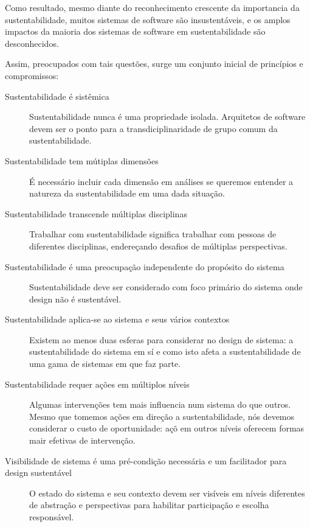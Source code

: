 Como resultado, mesmo diante do reconhecimento crescente da importancia da sustentabilidade,
muitos sistemas de software são insustentáveis, e os amplos impactos
da maioria dos sistemas de software em sustentabilidade são desconhecidos.

Assim, preocupados com tais questões, surge um conjunto inicial de princípios e
compromissos:

\begin{description}

  \item [Sustentabilidade é sistêmica]
    Sustentabilidade nunca é uma propriedade isolada. Arquitetos de software devem
    ser o ponto para a transdiciplinaridade de grupo comum da sustentabilidade.

  \item [Sustentabilidade tem mútiplas dimensões]
    É necessário incluir cada dimensão em análises se queremos entender
    a natureza da sustentabilidade em uma dada situação.

  \item [Sustentabilidade transcende múltiplas disciplinas]
    Trabalhar com sustentabilidade significa trabalhar com pessoas de diferentes
    disciplinas, endereçando desafios de múltiplas perspectivas.

  \item [Sustentabilidade é uma preocupação independente do propósito do sistema]
    Sustentabilidade deve ser considerado com foco primário do sistema onde
    design não é sustentável.

  \item [Sustentabilidade aplica-se ao sistema e seus vários contextos]
    Existem ao menos duas esferas para considerar no design de sistema: a sustentabilidade do
    sistema em sí e como isto afeta a sustentabilidade de uma gama de sistemas em que faz parte.

  \item [Sustentabilidade requer ações em múltiplos níveis]
    Algumas intervenções tem mais influencia num sistema do que outros. Mesmo que tomemos
    ações em direção a sustentabilidade, nós devemos considerar o custo de oportunidade:
    açõ em outros níveis oferecem formas mair efetivas de intervenção.

  \item [Visibilidade de sistema é uma pré-condição necessária e um facilitador para design sustentável]
    O estado do sistema e seu contexto devem ser visíveis em níveis diferentes de abstração
    e perspectivas para habilitar participação e escolha responsável.


\end{description}
